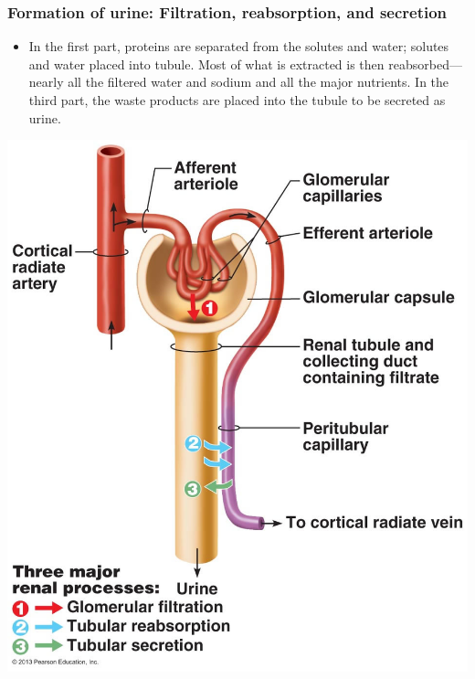 \documentclass[11pt]{article}
\begin{document}
\subsubsection{Formation of urine: Filtration, reabsorption, and secretion}
\label{sec:org1c11820}
\begin{itemize}
\item In the first part, proteins are separated from the solutes and water; solutes
and water placed into tubule. Most of what is extracted is then
reabsorbed---nearly all the filtered water and sodium and all the major
nutrients. In the third part, the waste products are placed into the tubule to
be secreted as urine.
\end{itemize}

\begin{center}
\includegraphics[width=.9\linewidth]{Ch. 15/figure_25_09_labeled_2016-11-16_20-43-29.jpg}
\end{center}
\end{document}
